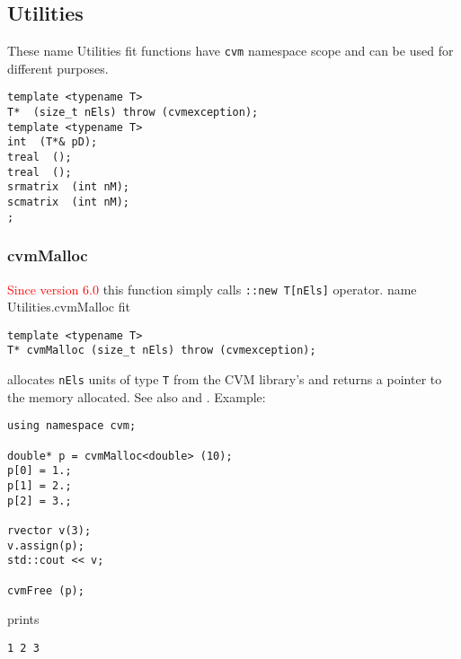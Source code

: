 \subsection{Utilities}
These%
\pdfdest name {Utilities} fit{}
functions have \verb"cvm" namespace scope and
can be used for different purposes.

\bigskip
\noindent
\verb"template <typename T>"\\
\verb"T* "\verb" (size_t nEls) throw (cvmexception);"\\
\verb"template <typename T>"\\
\verb"int "\verb" (T*& pD);"\\
\verb"treal "\verb" ();"\\
\verb"treal "\verb" ();"\\
\verb"srmatrix "\verb" (int nM);"\\
\verb"scmatrix "\verb" (int nM);"\\
\verb";"\\
\verb""
\newpage




\subsubsection{cvmMalloc}
\textcolor{red}{Since version 6.0} %
this function simply calls \verb"::new T[nEls]" operator.%
\pdfdest name {Utilities.cvmMalloc} fit
\begin{verbatim}
template <typename T>
T* cvmMalloc (size_t nEls) throw (cvmexception);
\end{verbatim}
allocates \verb"nEls" units of type \verb"T"
from the CVM library's  and returns
a pointer to the memory allocated.
See also  and
.
Example:
\begin{Verbatim}
using namespace cvm;

double* p = cvmMalloc<double> (10);
p[0] = 1.;
p[1] = 2.;
p[2] = 3.;

rvector v(3);
v.assign(p);
std::cout << v;

cvmFree (p);
\end{Verbatim}
prints
\begin{Verbatim}
1 2 3
\end{Verbatim}
\newpage




